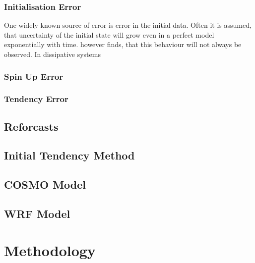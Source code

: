 \subsection{Initialisation Error}
One widely known source of error is error in the initial data. Often it is assumed, that uncertainty of the initial state will grow even in a perfect model exponentially with time. \cite{smith1999uncertainty} however finds, that this behaviour will not always be observed. In dissipative systems 
\subsection{Spin Up Error}
\subsection{Tendency Error}

\section{Reforcasts}
\section{Initial Tendency Method}
\section{COSMO Model}
\section{WRF Model}


\chapter{Methodology}